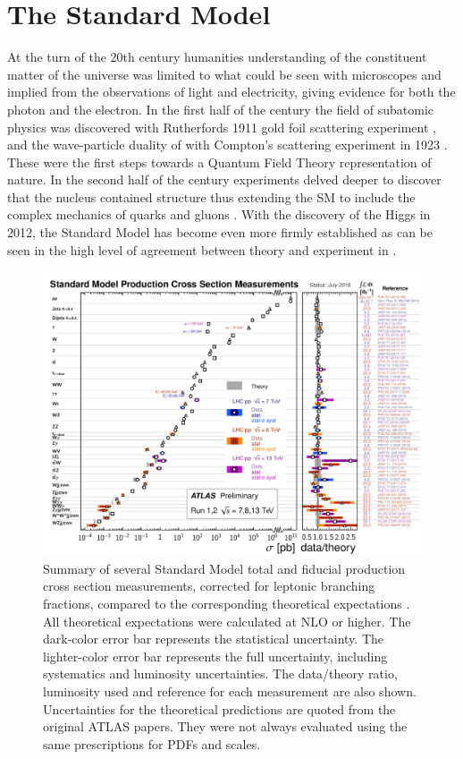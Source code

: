 \section{The Standard Model} \label{sec:theory:standardmodel}

At the turn of the 20th century humanities understanding of the constituent
matter of the universe was limited to what could be seen with microscopes and
implied from the observations of light and electricity, giving evidence for
both the photon and the electron.  In the first half of the century the field
of subatomic physics was discovered with Rutherfords 1911 gold foil scattering
experiment \cite{Rutherford:1911zz}, and the wave-particle duality of with
Compton's scattering experiment in 1923 \cite{PhysRev.21.483}. These were the
first steps towards a Quantum Field Theory representation of nature.  In the
second half of the century experiments delved deeper to discover that the
nucleus contained structure thus extending the SM to include the complex
mechanics of quarks and gluons \cite{Fritzsch:1972jv}.  With the discovery of
the Higgs in 2012, the Standard Model has become even more firmly established
as can be seen in the high level of agreement between theory and experiment in
.

\begin{figure}[!htbp]
  \begin{center}
    \includegraphics[width=\linewidth]{figures/theory/xsection_measurements.pdf}
\caption{ Summary of several Standard Model total and fiducial production cross
section measurements, corrected for leptonic branching fractions, compared to
the corresponding theoretical expectations \cite{StandardModelPublicResults}.
All theoretical expectations were calculated at NLO or higher. The dark-color
error bar represents the statistical uncertainty. The lighter-color error bar
represents the full uncertainty, including systematics and luminosity
uncertainties. The data/theory ratio, luminosity used and reference for each
measurement are also shown. Uncertainties for the theoretical predictions are
quoted from the original ATLAS papers. They were not always evaluated using the
same prescriptions for PDFs and scales.}
    \label{fig:xsection_measurements}
  \end{center}
\end{figure}

